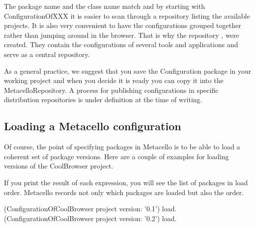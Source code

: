 \documentclass[a4paper,10pt,twoside]{book}
\begin{document}
The package name and the class name match and by starting with ConfigurationOfXXX it is easier to scan through a repository listing the available projects. It is also very convenient to have the configurations grouped together rather than jumping around in the browser. That is why the repository ,  were created. They contain the configurations of several tools and applications and serve as a central repository. 


As a general practice, we suggest that you save the Configuration package in your working project and when you decide it is ready you can copy it into the MetacelloRepository. A process for publishing configurations in specific distribution repositories is under definition at the time of writing.



\subsection{Loading a Metacello configuration}
Of course, the point of specifying packages in Metacello is to be able to load a coherent set of package versions. Here are a couple of examples for loading versions of the CoolBrowser project. 

If you print the result of each expression, you will see the list of packages in load order. Metacello records not only which packages are loaded but also the order. 

\begin{code}{}
  (ConfigurationOfCoolBrowser project version: '0.1') load.
  (ConfigurationOfCoolBrowser project version: '0.2') load.
\end{code}
  
\end{document}
